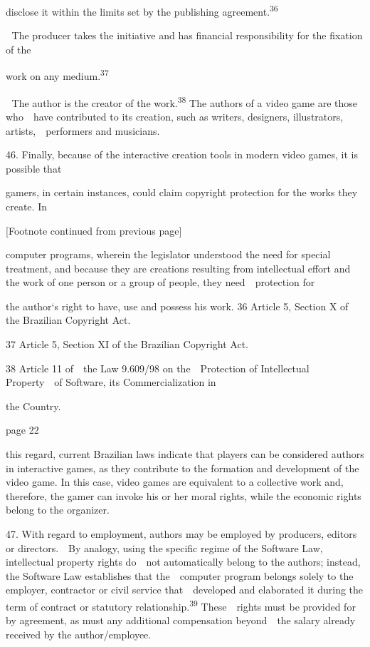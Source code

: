 \documentclass[
]{article}
\begin{document}
{disclose it within the limits set by the publishing
agreement.}\textsuperscript{{36}}

{ }{The producer takes the initiative and has financial responsibility
for the fixation of the}

{work on any medium.}\textsuperscript{{37}}

{ }{The author is the creator of the work.}\textsuperscript{{38 }}{The
authors of a video game are those who~~have contributed to its creation,
such as writers, designers, illustrators, artists,~~performers and
musicians.}

{46. }{Finally, because of the interactive creation tools in modern
video games, it is possible that}

{gamers, in certain instances, could claim copyright protection for the
works they create. In}

{{[}Footnote continued from previous page{]}}

{computer programs, wherein the legislator understood the need for
special treatment, and because they are creations resulting from
intellectual effort and the work of one person or a group of people,
they need~~protection for}

{the author`s right to have, use and posse}{ss his work}{. }{36
}{Article 5, Section X of the Brazilian }{Copyright Act}{.}

{37 }{Article 5, Section XI of the Brazilian }{Copyright Act}{.}

{38 }{Article 11 of~~the }{Law 9.609/98 on the~~Protection of
Intellectual Property~~of Software, its Commercialization in}

{the Country.}

{page 22}

{this regard, current Brazilian laws indicate that players can be
considered authors in interactive games, as they contribute to the
formation and development of the video game. In this case, video games
are equivalent to a collective work and, therefore, the gamer can invoke
his or her moral rights, while the economic rights belong to the
organizer.}

{47. }{With regard to employment, authors may be employed by producers,
editors or directors.~~By analogy, using the specific regime of the
}{Software Law}{, intellectual property rights do~~not automatically
belong to the authors; instead, the }{Software Law }{establishes that
the~~computer program belongs solely to the employer, contractor or
civil service that~~developed and elaborated it during the term of
contract or statutory relationship.}\textsuperscript{{39
}}{These~~rights must be provided for by agreement, as must any
additional compensation beyond~~the salary already received by the
author/employee.}
\end{document}
